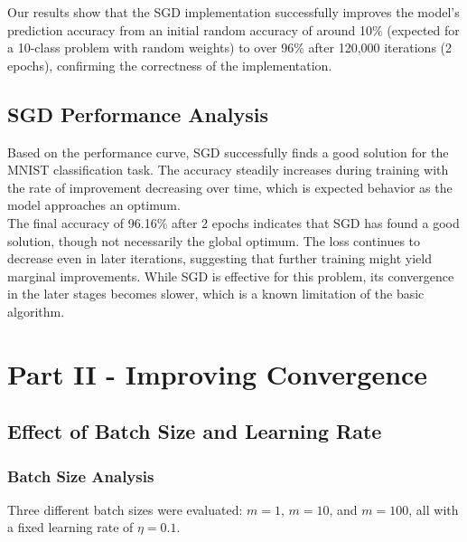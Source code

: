 \documentclass{article}
\begin{document}

\noindent Our results show that the SGD implementation successfully 
improves the model's prediction accuracy from an initial 
random accuracy of around 10\% (expected for a 10-class problem with random weights) 
to over 96\% after 120,000 iterations (2 epochs), 
confirming the correctness of the implementation.

\subsection{SGD Performance Analysis}

Based on the performance curve, SGD successfully finds a 
good solution for the MNIST classification task. 
The accuracy steadily increases during training with the 
rate of improvement decreasing over time, which is expected 
behavior as the model approaches an optimum. \\

\noindent The final accuracy of 96.16\% after 2 epochs indicates that 
SGD has found a good solution, though not necessarily the 
global optimum. The loss continues to decrease even in later iterations, suggesting that further training might yield marginal improvements. While SGD is effective for this problem, its convergence in the later stages becomes slower, which is a known limitation of the basic algorithm.

\section{Part II - Improving Convergence}

\subsection{Effect of Batch Size and Learning Rate}

\subsubsection{Batch Size Analysis}
Three different batch sizes were evaluated: $m=1$, $m=10$, and $m=100$, all with a fixed learning rate of $\eta=0.1$. 
\end{document}
